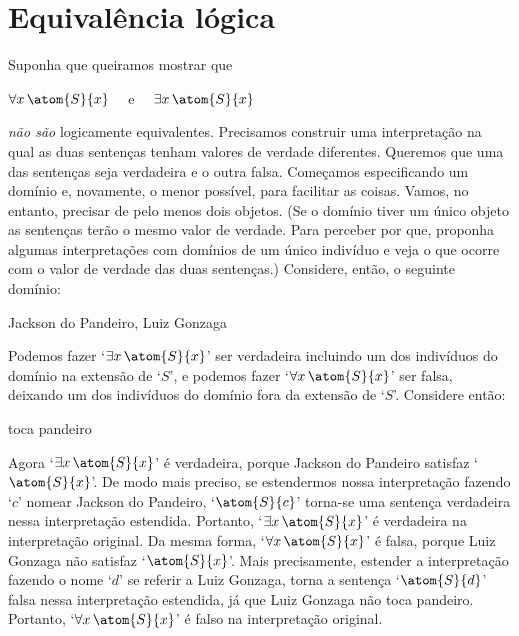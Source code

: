 \section{Equivalência lógica}
Suponha que queiramos mostrar que
\begin{center}
	$\forall x\, \atom{S}{x}$ \ \ e \ \ $\exists x\, \atom{S}{x}$
\end{center}
\emph{não são} logicamente equivalentes.
Precisamos construir uma interpretação na qual as duas sentenças tenham valores de verdade diferentes.
Queremos que uma das sentenças seja verdadeira e o outra falsa.
Começamos especificando um domínio e, novamente, o menor possível, para facilitar as coisas.
Vamos, no entanto, precisar de pelo menos dois objetos.
(Se o domínio tiver um único objeto as sentenças terão o mesmo valor de verdade. 
Para perceber por que, proponha algumas interpretações com domínios de um único indivíduo e veja o que ocorre com o valor de verdade das duas sentenças.)
Considere, então, o seguinte domínio:
	\begin{center}
	\begin{ekey}
		\item[\text{domínio}] Jackson do Pandeiro, Luiz Gonzaga
	\end{ekey}
	\end{center}
Podemos fazer `$\exists x\, \atom{S}{x}$' ser verdadeira incluindo um dos indivíduos do domínio na extensão de `$S$', e podemos fazer `$\forall x\, \atom{S}{x}$' ser falsa, deixando um dos indivíduos do domínio fora da extensão de `$S$'.
Considere então:
	\begin{center}
	\begin{ekey}
		\item[\atom{S}{x}]  toca pandeiro
	\end{ekey}
	\end{center}
Agora `$\exists x\, \atom{S}{x}$' é verdadeira, porque Jackson do Pandeiro satisfaz `$\atom{S}{x}$'.
De modo mais preciso, se estendermos nossa interpretação fazendo `$c$' nomear Jackson do Pandeiro, `$\atom{S}{c}$' torna-se uma sentença verdadeira nessa interpretação estendida.
Portanto, `$\exists x\, \atom{S}{x}$' é verdadeira na interpretação original.
Da mesma forma, `$\forall x\, \atom{S}{x}$' é falsa, porque Luiz Gonzaga não satisfaz `$\atom{S}{x}$'.
Mais precisamente, estender a interpretação fazendo o nome `$d$' se referir a Luiz Gonzaga, torna a sentença `$\atom{S}{d}$' falsa nessa interpretação estendida, já que Luiz Gonzaga não toca pandeiro.
Portanto, `$\forall x\, \atom{S}{x}$' é falso na interpretação original.
